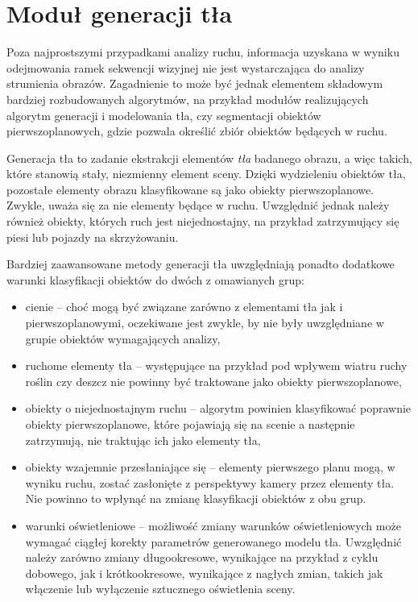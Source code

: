 \section{Moduł generacji tła}

Poza najprostszymi przypadkami analizy ruchu, informacja uzyskana w wyniku odejmowania ramek sekwencji wizyjnej nie jest wystarczająca do analizy strumienia obrazów.
Zagadnienie to może być jednak elementem składowym bardziej rozbudowanych algorytmów, na przykład modułów realizujących algorytm generacji i modelowania tła, czy segmentacji obiektów pierwszoplanowych, gdzie pozwala określić zbiór obiektów będących w ruchu. %

Generacja tła to zadanie ekstrakcji elementów \textit{tła} badanego obrazu, a więc takich, które stanowią stały, niezmienny element sceny. 
Dzięki wydzieleniu obiektów tła, pozostałe elementy obrazu klasyfikowane są jako obiekty pierwszoplanowe. 
Zwykle, uważa się za nie elementy będące w ruchu. Uwzględnić jednak należy również obiekty, których ruch jest niejednostajny, na przykład zatrzymujący się piesi lub pojazdy na skrzyżowaniu. %

Bardziej zaawansowane metody generacji tła uwzględniają ponadto dodatkowe warunki klasyfikacji obiektów do dwóch z omawianych grup:
\begin{itemize}
	\item cienie -- choć mogą być związane zarówno z elementami tła jak i pierwszoplanowymi, oczekiwane jest zwykle, by nie były uwzględniane w grupie obiektów wymagających analizy,
	\item ruchome elementy tła -- występujące na przykład pod wpływem wiatru ruchy roślin czy deszcz nie powinny być traktowane jako obiekty pierwszoplanowe,
	\item obiekty o niejednostajnym ruchu -- algorytm powinien klasyfikować poprawnie obiekty pierwszoplanowe, które pojawiają się na scenie a następnie zatrzymują, nie traktując ich jako elementy tła, %
	\item obiekty wzajemnie przesłaniające się -- elementy pierwszego planu mogą, w wyniku ruchu, zostać zasłonięte z perspektywy kamery przez elementy tła. Nie powinno to wpłynąć na zmianę klasyfikacji obiektów z obu grup.
	\item warunki oświetleniowe -- możliwość zmiany warunków oświetleniowych może wymagać ciągłej korekty parametrów generowanego modelu tła. Uwzględnić należy zarówno zmiany długookresowe, wynikające na przykład z cyklu dobowego, jak i krótkookresowe, wynikające z nagłych zmian, takich jak włączenie lub wyłączenie sztucznego oświetlenia sceny.
\end{itemize}

